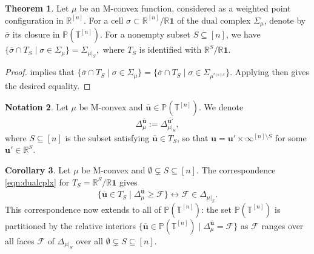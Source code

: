 \documentclass[11pt]{amsart}
\newcommand{\RR}{\mathbb R}
\newcommand{\PP}{\mathbb P}
\newcommand{\TT}{\mathbb T}
\newcommand{\bu}{{\mathbf u}}
\theoremstyle{definition}
\newtheorem{thm}{Theorem}[subsection]
\newtheorem{cor}[thm]{Corollary}
\newtheorem{notation}[thm]{Notation}
\newcommand{\chris}[1]{{\color{cyan} \sf Chris: [#1]}}
\begin{document}
\begin{thm}\label{thm:Mconvexdualcplx}
Let $\mu$ be an M-convex function, considered as a weighted point configuration in $\RR^{[n]}$.  For a cell $\sigma \subset \RR^{[n]}/\RR\mathbf 1$ of the dual complex $\Sigma_\mu$, denote by $\overline\sigma$ its closure in $\PP(\TT^{[n]})$. 
For a nonempty subset $S\subseteq [n]$, we have
$
\{\overline\sigma \cap T_S \mid \sigma\in\Sigma_\mu\} = \Sigma_{\mu|_S},
$
where $T_S$ is identified with $\RR^{S}/\RR\mathbf 1$.
\end{thm}
\begin{proof}%
 implies that $\{\overline\sigma \cap T_S \mid \sigma\in\Sigma_\mu\} = \{\overline\sigma \cap T_S \mid \sigma\in\Sigma_{\mu^{e_{[n]\setminus S}}}\}$. Applying  then gives the desired equality.
\end{proof}

\begin{notation}
Let $\mu$ be M-convex and $\overline\bu \in \PP(\TT^{[n]})$.  We denote
\[
\Delta_\mu^{\overline\bu} := \Delta_{\mu|_S}^{\overline {\bu'}},
\]
where $S\subseteq [n]$ is the subset satisfying $\overline\bu\in T_S$, so that $\bu = \bu'\times \infty^{[n]\setminus S}$ for some $\bu'\in \RR^{S}$.
\end{notation}

\begin{cor}\label{cor:Mconvexdualcplx}
Let $\mu$ be M-convex and $\emptyset\subsetneq S\subseteq [n]$.  The correspondence \eqref{eqn:dualcplx} for $T_S=\RR^S/\RR\mathbf 1$ gives
\[
\{ \overline\bu \in T_S \mid \Delta_{\mu}^{\overline\bu} \geq \mathcal F\} \longleftrightarrow \mathcal F \in \Delta_{\mu|_S}.
\]
This correspondence now extends to all of $\PP(\TT^{[n]})$:  the set $\PP(\TT^{[n]})$ is partitioned by the relative interiors $\{\overline\bu \in \PP(\TT^{[n]}) \mid \Delta_{\mu}^{\overline\bu} = \mathcal F\}$ as $\mathcal F$ ranges over all faces $\mathcal F$ of $\Delta_{\mu|_S}$ over all $\emptyset\subsetneq S \subseteq [n]$.
\end{cor}
\end{document}
